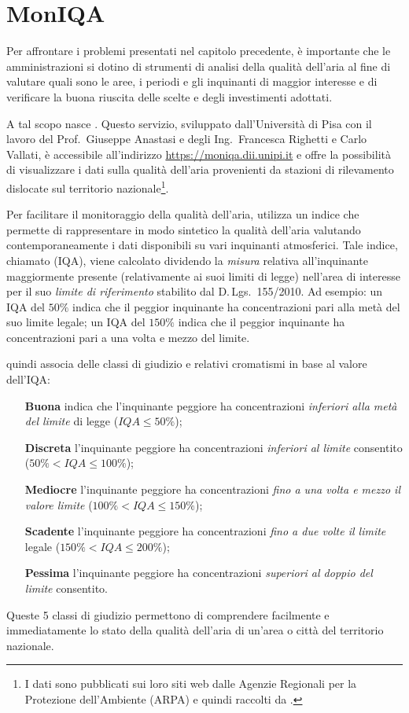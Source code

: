 \section{MonIQA}

Per affrontare i problemi presentati nel capitolo precedente, è importante che
le amministrazioni si dotino di strumenti di analisi della qualità dell'aria al
fine di valutare quali sono le aree, i periodi e gli inquinanti di maggior
interesse e di verificare la buona riuscita delle scelte e degli investimenti
adottati.

A tal scopo nasce \MonIQA\@. Questo servizio, sviluppato dall'Università di Pisa
con il lavoro del Prof.\ Giuseppe Anastasi e degli Ing.\ Francesca Righetti e
Carlo Vallati, è accessibile all'indirizzo \url{https://moniqa.dii.unipi.it} e
offre la possibilità di visualizzare i dati sulla qualità dell'aria provenienti
da stazioni di rilevamento dislocate sul territorio nazionale\footnote{I dati
sono pubblicati sui loro siti web dalle Agenzie Regionali per la Protezione
dell'Ambiente (ARPA) e quindi raccolti da \MonIQA\@.}.

Per facilitare il monitoraggio della qualità dell'aria, \MonIQA{} utilizza un
indice che permette di rappresentare in modo sintetico la qualità dell'aria
valutando contemporaneamente i dati disponibili su vari inquinanti atmosferici.
Tale indice, chiamato  (IQA), viene
calcolato dividendo la \emph{misura} relativa all'inquinante maggiormente
presente (relativamente ai suoi limiti di legge) nell'area di interesse per il
suo \emph{limite di riferimento} stabilito dal \mbox{D.\,Lgs.}~155/2010. Ad
esempio: un IQA del \(50\%\) indica che il peggior inquinante ha concentrazioni
pari alla metà del suo limite legale; un IQA del \(150\%\) indica che il peggior
inquinante ha concentrazioni pari a una volta e mezzo del limite.

\MonIQA{} quindi associa delle classi di giudizio e relativi cromatismi in base
al valore dell'IQA:
\begin{itemize}
	\item [\textbf{Buona} \colorbullet{goodiqa}] indica che l'inquinante
		peggiore ha concentrazioni \emph{inferiori alla metà del limite}
		di legge (\(IQA \leq 50\%\));
	\item [\textbf{Discreta} \colorbullet{reasonableiqa}] l'inquinante
		peggiore ha concentrazioni \emph{inferiori al limite} consentito
		(\(50\% < IQA \leq 100\%\));
	\item [\textbf{Mediocre} \colorbullet{mediocreiqa}] l'inquinante
		peggiore ha concentrazioni \emph{fino a una volta e mezzo il
		valore limite} (\(100\% < IQA \leq 150\%\));
	\item [\textbf{Scadente} \colorbullet{pooriqa}] l'inquinante peggiore ha
		concentrazioni \emph{fino a due volte il limite} legale (\(150\%
		< IQA \leq 200\%\));
	\item [\textbf{Pessima} \colorbullet{badiqa}] l'inquinante peggiore ha
		concentrazioni \emph{superiori al doppio del limite} consentito.
\end{itemize}
Queste 5 classi di giudizio permettono di comprendere facilmente e
immediatamente lo stato della qualità dell'aria di un'area o città del
territorio nazionale.

